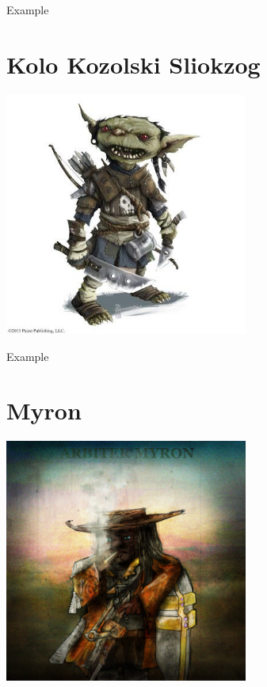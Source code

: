 \documentclass[letterpaper,10pt,twoside,twocolumn,openany]{book}
\begin{document}
\begin{paperbox}{Example}
  \lipsum[2]
\end{paperbox}

\clearpage


\section{Kolo Kozolski Sliokzog}

\begin{center}
\includegraphics[width=80mm]{./img/kolo.jpg}
\begin{figure}[h]
\end{figure}
\end{center}

\begin{paperbox}{Example}
  \lipsum[2]
\end{paperbox}

\clearpage


\section{Myron}

\begin{center}
\includegraphics[width=80mm]{./img/myron1.png}
\begin{figure}[h]
\end{figure}
\end{center}
\end{document}
